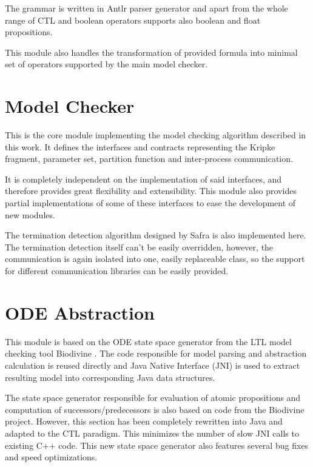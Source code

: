 \documentclass[12pt,oneside]{fithesis2}
\begin{document}
			The grammar is written in Antlr parser generator and apart from the whole range of CTL and boolean operators supports also boolean and float propositions.
				
			This module also handles the transformation of provided formula into minimal set of operators supported by the main model checker.
				
		\section{Model Checker}
			
			This is the core module implementing the model checking algorithm described in this work. It defines the interfaces and contracts representing the Kripke fragment, parameter set, partition function and inter-process communication.
				
			It is completely independent on the implementation of said interfaces, and therefore provides great flexibility and extensibility. This module also provides partial implementations of some of these interfaces to ease the development of new modules. 
				
			The termination detection algorithm designed by Safra \cite{safra} is also implemented here. The termination detection itself can't be easily overridden, however, the communication is again isolated into one, easily replaceable class, so the support for different communication libraries can be easily provided.
	
		\section{ODE Abstraction}
			
			This module is based on the ODE state space generator from the LTL model checking tool Biodivine \cite{biodivine}. The code responsible for model parsing and abstraction calculation is reused directly and Java Native Interface (JNI) is used to extract resulting model into corresponding Java data structures.
				
			The state space generator responsible for evaluation of atomic propositions and computation of successors/predecessors is also based on code from the Biodivine project. However, this section has been completely rewritten into Java and adapted to the CTL paradigm. This minimizes the number of slow JNI calls to existing C++ code. This new state space generator also features several bug fixes and speed optimizations.
				
\end{document}
